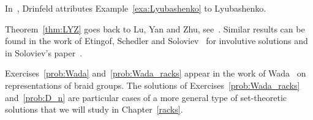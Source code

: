 In~\cite{MR1183474}, Drinfeld attributes Example~\ref{exa:Lyubashenko} to 
Lyubashenko. 

Theorem~\ref{thm:LYZ} goes back to Lu, Yan and Zhu, see~\cite{MR1769723}.
Similar results can be found in the work of Etingof, Schedler and Soloviev~\cite{MR1722951} 
for involutive solutions 
and in Soloviev's paper~\cite{MR1809284}.

Exercises~\ref{prob:Wada} and~\ref{prob:Wada_racks} 
appear in the work of Wada~\cite{MR1167178} on representations of braid groups. 
The solutions of Exercises~\ref{prob:Wada_racks} and~\ref{prob:D_n} 
are particular cases of a more general type of set-theoretic solutions that we will study in 
Chapter~\ref{racks}.  
 

